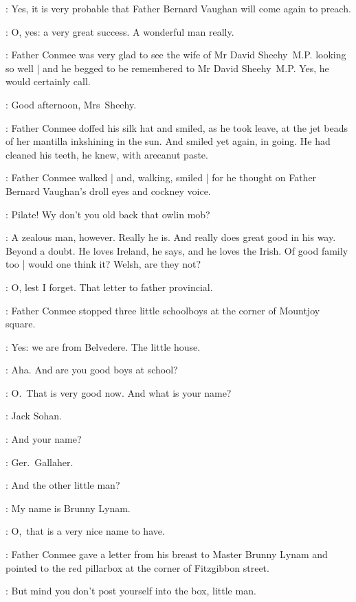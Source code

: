 \conmee:
Yes, it is very probable that Father Bernard Vaughan will come again to preach.

\conmee:
O, yes: a very great success.
A wonderful man really.

:
Father Conmee was very glad 
to see the wife of Mr David Sheehy~M.P. looking so well |
and he begged to be remembered to Mr David Sheehy~M.P.
Yes, he would certainly call.

\conmee:
Good afternoon, Mrs~Sheehy.


:
Father Conmee doffed his silk hat and smiled,
as he took leave,
at the jet beads of her mantilla inkshining in the sun.
And smiled yet again, in going.
He had cleaned his teeth, he knew, with arecanut paste.

:
Father Conmee walked |
and, walking, smiled |
for he thought on
Father Bernard Vaughan's droll eyes and cockney voice.

\conmeeint: 
Pilate!
Wy don't you old back that owlin mob?

\conmeeint:
A zealous man, however.
Really he is.
And really does great good in his way.
Beyond a doubt.
He loves Ireland, he says, and he loves the Irish.
Of good family too |
would one think it?
Welsh, are they not?

\conmeeint:
O, lest I forget.
That letter to father provincial.

:
Father Conmee stopped three little schoolboys
at the corner of Mountjoy square.

\Boys:
Yes: we are from Belvedere.
The little house.

\conmee:
Aha.
And are you good boys at school?

\conmee:
O.~That is very good now.
And what is your name?

:
Jack Sohan.

\conmee:
And your name?

:
Ger.~Gallaher.

\conmee:
And the other little man?

:
My name is Brunny Lynam.

\conmee:
O,~that is a very nice name to have.

:
Father Conmee gave a letter from his breast to Master Brunny Lynam
and pointed to the red pillarbox at the corner of Fitzgibbon street.

\conmee:
But mind you don't post yourself into the box, little man.

